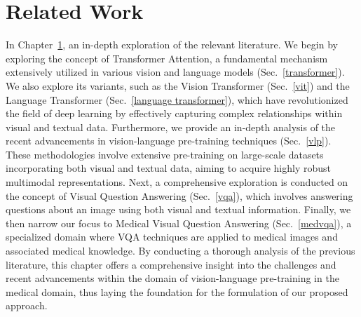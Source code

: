 \chapter{Related Work}
\label{chapter:ch2}

In Chapter~\ref{chapter:ch2}, an in-depth exploration of the relevant literature. We begin by exploring the concept of Transformer Attention, a fundamental mechanism extensively utilized in various vision and language models (Sec.~\ref{transformer}). We also explore its variants, such as the Vision Transformer (Sec.~\ref{vit}) and the Language Transformer (Sec.~\ref{language transformer}), which have revolutionized the field of deep learning by effectively capturing complex relationships within visual and textual data. Furthermore, we provide an in-depth analysis of the recent advancements in vision-language pre-training techniques (Sec.~\ref{vlp}). These methodologies involve extensive pre-training on large-scale datasets incorporating both visual and textual data, aiming to acquire highly robust multimodal representations. Next, a comprehensive exploration is conducted on the concept of Visual Question Answering (Sec.~\ref{vqa}), which involves answering questions about an image using both visual and textual information. Finally, we then narrow our focus to Medical Visual Question Answering (Sec.~\ref{medvqa}), a specialized domain where VQA techniques are applied to medical images and associated medical knowledge. By conducting a thorough analysis of the previous literature, this chapter offers a comprehensive insight into the challenges and recent advancements within the domain of vision-language pre-training in the medical domain, thus laying the foundation for the formulation of our proposed approach.

